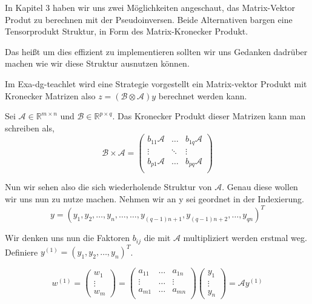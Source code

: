 In Kapitel 3 haben wir uns zwei Möglichkeiten angeschaut, das Matrix-Vektor Produt zu berechnen mit der Pseudoinversen. Beide Alternativen bargen eine Tensorprodukt Struktur, in Form des Matrix-Kronecker Produkt.

Das heißt um dies effizient zu implementieren sollten wir uns Gedanken dadrüber machen wie wir diese Struktur ausnutzen können.

Im Exa-dg-teachlet wird eine Strategie vorgestellt ein Matrix-vektor Produkt mit Kronecker Matrizen also $z=(\mathcal{B} \otimes \mathcal{A})y$ berechnet werden kann.

Sei $\mathcal{A} \in \mathbb{R}^{m \times n}$ und $\mathcal{B} \in \mathbb{R}^{p \times q}$. Das Kronecker Produkt dieser Matrizen kann man schreiben als, 
\begin{equation*}
\mathcal{B} \times \mathcal{A} =
\begin{pmatrix}
b_{11}\mathcal{A} & \dots  & b_{1q}\mathcal{A} \\
\vdots & \ddots & \vdots \\
b_{p1}\mathcal{A} & \dots & b_{pq}\mathcal{A} \\
\end{pmatrix}
\end{equation*}

Nun wir sehen also die sich wiederholende Struktur von $\mathcal{A}$. Genau diese wollen wir uns nun zu nutze machen. Nehmen wir an y sei geordnet in der Indexierung.
\begin{equation*}
y = (y_1,y_2,\dots,y_n,\dots,\dots,y_{(q-1)n+1},y_{(q-1)n+2},\dots,y_{qn})^T
\end{equation*}

Wir denken uns nun die Faktoren $b_{ij}$ die mit $\mathcal{A}$ multipliziert werden erstmal weg. Definiere $y^{(1)}=(y_1,y_2,\dots,y_n)^T$.

\begin{equation*}
w^{(1)}=
\begin{pmatrix}
w_1 \\ \vdots \\ w_m 
\end{pmatrix}
=
\begin{pmatrix}
a_{11} & \dots & a_{1n} \\
\vdots & \dots & \vdots \\
a_{m1} & \dots & a_{mn} \\
\end{pmatrix}
\begin{pmatrix}
y_1 \\ \vdots \\ y_n
\end{pmatrix}
= \mathcal{A}y^{(1)}
\end{equation*}

